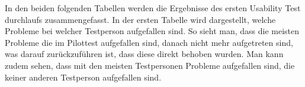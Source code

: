 

In den beiden folgenden Tabellen werden die Ergebnisse des ersten Usability Test durchlaufs zusammengefasst. In der ersten Tabelle wird dargestellt, welche Probleme bei welcher Testperson aufgefallen sind. So sieht man, dass die meisten Probleme die im Pilottest aufgefallen sind, danach nicht mehr aufgetreten sind, was darauf zurückzuführen ist, dass diese direkt behoben wurden. Man kann zudem sehen, dass mit den meisten Testpersonen Probleme aufgefallen sind, die keiner anderen Testperson aufgefallen sind.

